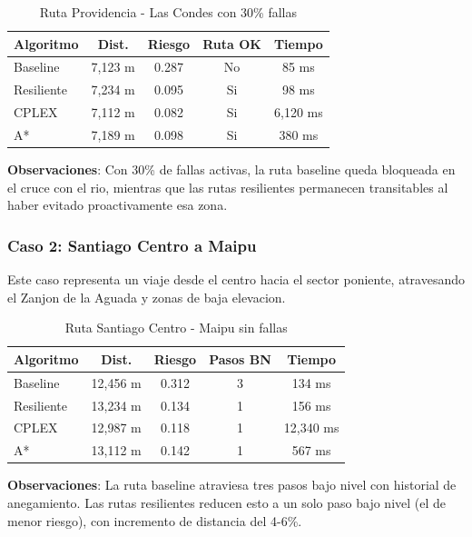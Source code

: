 \documentclass[conference]{IEEEtran}
\begin{document}
\begin{table}[!t]
\centering
\caption{Ruta Providencia - Las Condes con 30\% fallas}
\begin{tabular}{@{}lcccc@{}}
\toprule
\textbf{Algoritmo} & \textbf{Dist.} & \textbf{Riesgo} & \textbf{Ruta OK} & \textbf{Tiempo} \\
\midrule
Baseline & 7,123 m & 0.287 & No & 85 ms \\
Resiliente & 7,234 m & 0.095 & Si & 98 ms \\
CPLEX & 7,112 m & 0.082 & Si & 6,120 ms \\
A* & 7,189 m & 0.098 & Si & 380 ms \\
\bottomrule
\end{tabular}
\end{table}

\textbf{Observaciones}: Con 30\% de fallas activas, la ruta baseline queda bloqueada en el cruce con el rio, mientras que las rutas resilientes permanecen transitables al haber evitado proactivamente esa zona.

\subsubsection{Caso 2: Santiago Centro a Maipu}

Este caso representa un viaje desde el centro hacia el sector poniente, atravesando el Zanjon de la Aguada y zonas de baja elevacion.

\begin{table}[!t]
\centering
\caption{Ruta Santiago Centro - Maipu sin fallas}
\begin{tabular}{@{}lcccc@{}}
\toprule
\textbf{Algoritmo} & \textbf{Dist.} & \textbf{Riesgo} & \textbf{Pasos BN} & \textbf{Tiempo} \\
\midrule
Baseline & 12,456 m & 0.312 & 3 & 134 ms \\
Resiliente & 13,234 m & 0.134 & 1 & 156 ms \\
CPLEX & 12,987 m & 0.118 & 1 & 12,340 ms \\
A* & 13,112 m & 0.142 & 1 & 567 ms \\
\bottomrule
\end{tabular}
\end{table}

\textbf{Observaciones}: La ruta baseline atraviesa tres pasos bajo nivel con historial de anegamiento. Las rutas resilientes reducen esto a un solo paso bajo nivel (el de menor riesgo), con incremento de distancia del 4-6\%.
\end{document}

